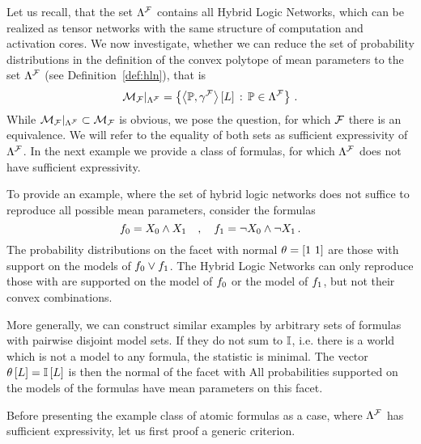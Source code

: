 Let us recall, that the set $\Lambda^{\mathcal{F}}$ contains all Hybrid Logic Networks, which can be realized as tensor networks with the same structure of computation and activation cores.
We now investigate, whether we can reduce the set of probability distributions in the definition of the convex polytope of mean parameters to the set $\Lambda^{\mathcal{F}}$ (see Definition~\ref{def:hln}), that is
\begin{align*}
	\mathcal{M}_{\mathcal{F}}|_{\Lambda^{\mathcal{F}}} = \left\{ \left\langle \mathbb{P},\gamma^{\mathcal{F}}\right\rangle \left[ L \right] \, : \, \mathbb{P}\in\Lambda^{\mathcal{F}} \right\} \, .
\end{align*}
While $\mathcal{M}_{\mathcal{F}}|_{\Lambda^{\mathcal{F}}}\subset\mathcal{M}_{\mathcal{F}}$ is obvious, we pose the question, for which $\mathcal{F}$ there is an equivalence.
We will refer to the equality of both sets as sufficient expressivity of $\Lambda^{\mathcal{F}}$.
In the next example we provide a class of formulas, for which $\Lambda^{\mathcal{F}}$ does not have sufficient expressivity.

\begin{example}
	To provide an example, where the set of hybrid logic networks does not suffice to reproduce all possible mean parameters, consider the formulas
		\[ f_{0} = X_{0} \land X_{1} \quad, \quad f_{1} = \lnot X_{0} \land \lnot X_{1} \, . \]
	The probability distributions on the facet with normal $\theta=[1\,\, 1]$ are those with support on the models of $f_{0}\lor f_{1}$.
	The Hybrid Logic Networks can only reproduce those with are supported on the model of $f_{0}$ or the model of $f_{1}$, but not their convex combinations.
		
	More generally, we can construct similar examples by arbitrary sets of formulas with pairwise disjoint model sets.
	If they do not sum to $\mathbb{I}$, i.e. there is a world which is not a model to any formula, the statistic is minimal.
	The vector $\theta\left[L\right] = \mathbb{I}\left[L\right]$ is then the normal of the facet with 
	All probabilities supported on the models of the formulas have mean parameters on this facet.
\end{example}

Before presenting the example class of atomic formulas as a case, where $\Lambda^{\mathcal{F}}$ has sufficient expressivity, let us first proof a generic criterion.

